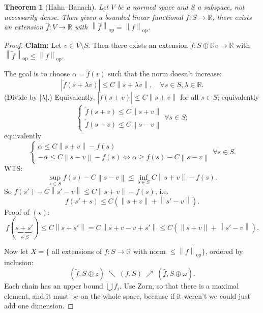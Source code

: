 \documentclass[12pt]{article}
\newcommand{\abs}[1]{\left| #1 \right|}
\newcommand{\norm}[1]{\left\| #1 \right\|}
\newcommand{\R}{\mathbb{R}}
\newtheorem{thm}{Theorem}[section]
\theoremstyle{definition}
\begin{document}
\begin{thm}[Hahn--Banach]
	Let $V$ be a normed space and $S$ a subspace, not necessarily dense.
	Then given a bounded linear functional $f : S \to \R$, there exists an extension $\hat{f} : V \to \R$ with $\norm{\hat{f}}_{\mathrm{op}} = \norm{f}_{\mathrm{op}}$.
\end{thm}
\begin{proof}
	\textbf{Claim: } Let $v \in V \setminus S$.
	Then there exists an extension $\tilde{f} : S \oplus \R v \to \R$ with $\norm{\tilde{f}}_{\mathrm{op}} \leq \norm{f}_{\mathrm{op}}$.

	The goal is to choose $\alpha = \tilde{f}(v)$ such that the norm doesn't increase:
	\begin{equation*}
		\abs{\tilde{f}(s + \lambda v)} \leq C \norm{s + \lambda v}, \quad \forall s \in S, \lambda \in \R.
	\end{equation*}
	(Divide by $\abs{\lambda}$.)
	Equivalently, $\abs{\tilde{f}(s \pm v)} \leq C \norm{s \pm v}$ for all $s \in S$; equivalently
	\begin{equation*}
		\begin{cases}
			\tilde{f}(s+v) \leq C \norm{s+v} \\
			\tilde{f}(s-v) \leq C \norm{s-v}
		\end{cases} \forall s \in S;
	\end{equation*}
	equivalently
	\begin{equation*}
		\begin{cases}
			\alpha \leq C \norm{s+v} - f(s) \\
			-\alpha \leq C \norm{s-v} - f(s) \iff \alpha \geq f(s) - C \norm{s-v}
		\end{cases} \forall s \in S.
	\end{equation*}
	WTS:
	\begin{equation*}
		\sup_{s \in S} f(s) - C \norm{s - v} \leq \inf_{s \in S} C \norm{s+v} - f(s).
	\end{equation*}
	So $f(s') - C\norm{s' - v} \leq C \norm{s+v} - f(s)$, i.e.
	\begin{equation*}
		f(s' + s) \leq C \left( \norm{s+v} + \norm{s'-v} \right). \tag{$\star$}
	\end{equation*}
	Proof of $(\star)$:
	\begin{equation*}
		f(\underbrace{s + s'}_{\in S}) \leq C \norm{s+s'} = C \norm{s + v - v + s'} \leq C \left( \norm{s+v} + \norm{s'-v} \right).
	\end{equation*}

	Now let $X = \lbrace$ all extensions of $f : S \to \R$ with norm $\leq \norm{f}_{\mathrm{op}} \rbrace$, ordered by inclusion:
	\begin{equation*}
		(\tilde{f}, S \oplus z) \ \nwarrow\ (f,S) \ \nearrow\ (\hat{f}, S \oplus \omega).
	\end{equation*}
	Each chain has an upper bound $\bigcup f_i$.
	Use Zorn, so that there is a maximal element, and it must be on the whole space, because if it weren't we could just add one dimension.
\end{proof}
\end{document}
